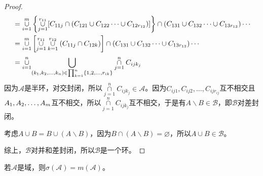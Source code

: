 \begin{proof}
\begin{align*}
		&=\underset{i=1}{\overset{m}{\cup}}\left\{\underset{j=1}{\overset{r_{11}}{\cup}}[C_{11j}\cap(C_{121}\cup C_{122}\cdots\cup C_{12r_{12}})]\right\}\cap(C_{131}\cup C_{132}\cdots\cup C_{13r_{13}})\cdots \\
		&=\underset{i=1}{\overset{m}{\cup}}\left[\underset{j=1}{\overset{r_{11}}{\cup}}\underset{k=1}{\overset{r_{12}}{\cup}}(C_{11j}\cap C_{12k})\right]\cap(C_{131}\cup C_{132}\cdots\cup C_{13r_{13}})\cdots \\
		&=\underset{i=1}{\overset{n}{\cup}}\underset{(k_1, k_2, \dots, k_{n})\in\prod_{k=1}^{n}\{1,2,\dots,r_{ik}\}}{\overset{}{\bigcup}}\underset{j=1}{\overset{n}{\cap}}C_{ijk_j}
	\end{align*}
	因为$\mathscr{A}$是半环，对交封闭，所以$\underset{j=1}{\overset{n}{\cap}}C_{ijk_j}\in \mathscr{A}$。因为$C_{ij1},C_{ij2},\dots,C_{ijr_{ij}}$互不相交且$A_1, A_2, \dots, A_{m}$互不相交，所以$\underset{j=1}{\overset{n}{\cap}}C_{ijk_j}$互不相交，于是有$A\backslash B\in \mathscr{B}$，即$\mathscr{B}$对差封闭。\par
	考虑$A\cup B=B\cup(A\backslash B)$，因为$B\cap (A\backslash B)=\varnothing$，所以$A\cup B\in \mathscr{B}$。\par
	综上，$\mathscr{B}$对并和差封闭，所以$\mathscr{B}$是一个环。
\end{proof}
\begin{theorem}\label{theo:SigmaField=MonotoneField}
	若$\mathscr{A}$是域，则$\sigma(\mathscr{A})=m(\mathscr{A})$。
\end{theorem}
